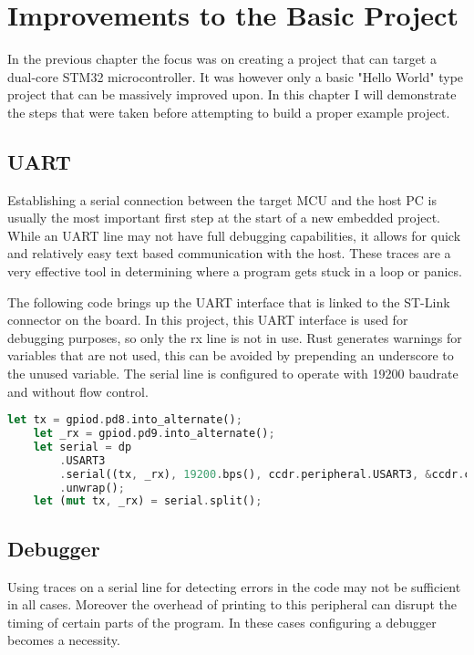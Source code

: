 \chapter{Improvements to the Basic Project}

In the previous chapter the focus was on creating a project that can target a dual-core STM32 microcontroller. It was however only a basic "Hello World" type project that can be massively improved upon. In this chapter I will demonstrate the steps that were taken before attempting to build a proper example project.

\section{UART}

Establishing a serial connection between the target MCU and the host PC is usually the most important first step at the start of a new embedded project. While an UART line may not have full debugging capabilities, it allows for quick and relatively easy text based communication with the host. These traces are a very effective tool in determining where a program gets stuck in a loop or panics.

The following code brings up the UART interface that is linked to the ST-Link connector on the board. In this project, this UART interface is used for debugging purposes, so only the rx line is not in use. Rust generates warnings for variables that are not used, this can be avoided by prepending an underscore to the unused variable. The serial line is configured to operate with 19200 baudrate and without flow control.

\begin{lstlisting}[language=Rust,frame=single,float=!ht,style=customrust,label={lst:uart-bringup},caption={UART Interface Configuration}]
    let tx = gpiod.pd8.into_alternate();
    let _rx = gpiod.pd9.into_alternate();
    let serial = dp
        .USART3
        .serial((tx, _rx), 19200.bps(), ccdr.peripheral.USART3, &ccdr.clocks)
        .unwrap();
    let (mut tx, _rx) = serial.split();
\end{lstlisting}

\section{Debugger}

Using traces on a serial line for detecting errors in the code may not be sufficient in all cases. Moreover the overhead of printing to this peripheral can disrupt the timing of certain parts of the program. In these cases configuring a debugger becomes a necessity.

